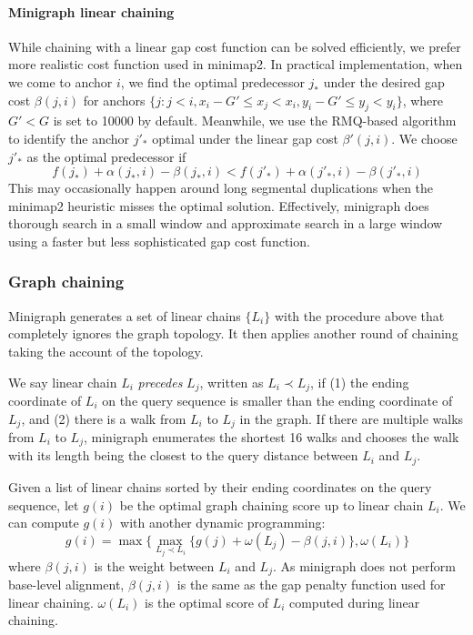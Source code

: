 \documentclass[twocolumn]{bmcart}
\begin{document}
\paragraph*{Minigraph linear chaining}
While chaining with a linear gap cost function can be solved efficiently, we
prefer more realistic cost function used in minimap2. In practical
implementation, when we come to anchor $i$, we find the optimal predecessor $j_*$
under the desired gap cost $\beta(j,i)$ for anchors $\{j:j<i,x_i-G'\le
x_j<x_i,y_i-G'\le y_j<y_i\}$, where $G'<G$ is set to 10000 by default.
Meanwhile, we use the RMQ-based algorithm to identify the anchor $j'_{*}$ optimal
under the linear gap cost $\beta'(j,i)$. We choose $j'_*$ as the optimal
predecessor if
$$
f(j_*)+\alpha(j_*,i)-\beta(j_*,i)<f(j'_*)+\alpha(j'_*,i)-\beta(j'_*,i)
$$
This may occasionally happen around long segmental duplications when the
minimap2 heuristic misses the optimal solution. Effectively, minigraph does
thorough search in a small window and approximate search in a large window
using a faster but less sophisticated gap cost function.

\subsubsection*{Graph chaining}

Minigraph generates a set of linear chains $\{L_i\}$ with the procedure above
that completely ignores the graph topology. It then applies another round of
chaining taking the account of the topology.

We say linear chain $L_i$ \emph{precedes} $L_j$, written as $L_i\prec L_j$, if
(1) the ending coordinate of $L_i$ on the query sequence is smaller than the
ending coordinate of $L_j$, and (2) there is a walk from $L_i$ to $L_j$ in the
graph. If there are multiple walks from $L_i$ to $L_j$, minigraph enumerates
the shortest 16 walks and chooses the walk with its length being the closest to
the query distance between $L_i$ and $L_j$.

Given a list of linear chains sorted by their ending coordinates on the query
sequence, let $g(i)$ be the optimal graph chaining score up to linear chain
$L_i$. We can compute $g(i)$ with another dynamic programming:
$$
g(i)=\max\big\{\max_{L_j\prec L_i}\{g(j)+\omega(L_j)-\beta(j,i)\},\omega(L_i)\big\}
$$
where $\beta(j,i)$ is the weight between $L_i$ and $L_j$. As minigraph does not
perform base-level alignment, $\beta(j,i)$ is the same as the gap penalty
function used for linear chaining. $\omega(L_i)$ is the optimal score of $L_i$
computed during linear chaining.
\end{document}

